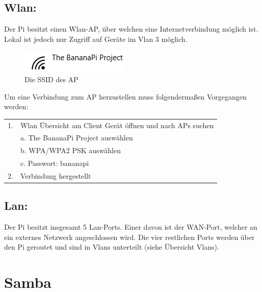 \subsection*{Wlan:}
Der Pi besitzt einen Wlan-AP, über welchen eine Internetverbindung möglich ist. Lokal ist jedoch nur Zugriff auf Geräte im Vlan 3 möglich.
\begin{figure}[ht]
\centering
\includegraphics[width=.4\textwidth]{pictures/Jonas/Anleitung/BILD2}
\caption{Die SSID des AP}
\end{figure}
Um eine Verbindung zum AP herzustellen muss folgendermaßen Vorgegangen werden:\\
\begin{tabular}{l l}
1. & Wlan Übersicht am Client Gerät öffnen und nach APs suchen\\
   & a. The BananaPi Project auswählen\\
   & b. WPA/WPA2 PSK auswählen\\
   & c. Passwort: bananapi\\
2. & Verbindung hergestellt\\
\end{tabular}

\subsection*{Lan:}
Der Pi besitzt insgesamt 5 Lan-Ports. Einer davon ist der WAN-Port, welcher an ein externes Netzwerk angeschlossen wird. Die vier restlichen Ports werden über den Pi geroutet und sind in Vlans unterteilt (siehe Übersicht Vlans).

\section{Samba}
